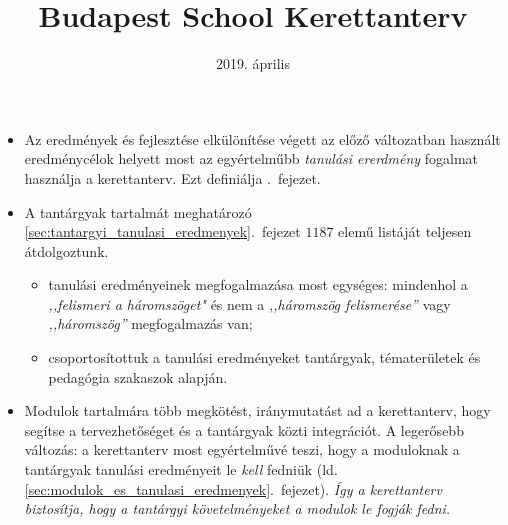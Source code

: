 \documentclass[magyar,12pt,a4paper,oneside,draft]{report}
\begin{document}
\newif\ifkerettanterv
\kerettantervtrue

\title{Budapest School Kerettanterv}
\author{}
\date{2019. \'aprilis}
\maketitle

\tableofcontents
\newpage
\begin{itemize}
    \item  Az eredmények és fejlesztése elkülönítése végett az előző
          változatban használt
          eredménycélok helyett most az egyértelműbb \emph{tanulási ererdmény}
          fogalmat
          használja a kerettanterv. Ezt definiálja
          .~fejezet.

    \item A tantárgyak tartalmát meghatározó
          \ref{sec:tantargyi_tanulasi_eredmenyek}.~fejezet $1187$ elemű
          listáját teljesen
          átdolgoztunk.
          \begin{itemize}
              \item tanulási eredményeinek megfogalmazása most egységes:
                    mindenhol a
                    \emph{,,felismeri a háromszöget"}
                    és nem a \emph{,,háromszög felismerése''} vagy
                    \emph{,,háromszög''}
                    megfogalmazás van;
              \item csoportosítottuk a tanulási eredményeket tantárgyak,
                    tématerületek és
                    pedagógia szakaszok alapján.
          \end{itemize}

    \item Modulok tartalmára több megkötést, iránymutatást ad a kerettanterv,
          hogy
          segítse a tervezhetőséget és a tantárgyak
          közti integrációt. A legerősebb változás: a kerettanterv most
          egyértelművé teszi, hogy a moduloknak a tantárgyak tanulási
          eredményeit le \emph{kell} fedniük (ld.
          \ref{sec:modulok_es_tanulasi_eredmenyek}.~fejezet).
          \emph{Így a kerettanterv biztosítja, hogy a tantárgyi követelményeket
              a modulok le fogják fedni.}


\end{itemize}
\end{document}
